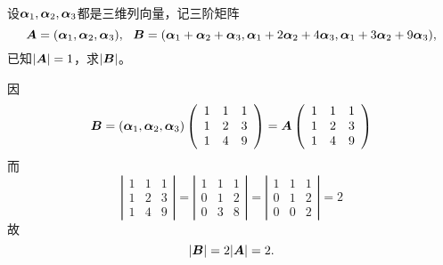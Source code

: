 \begin{frame}
  
    \begin{li}[2007－2008第二学期]
      设$\boldsymbol{\alpha}_1,\boldsymbol{\alpha}_2,\boldsymbol{\alpha}_3$都是三维列向量，记三阶矩阵
      $$
      \boldsymbol{A}=(\boldsymbol{\alpha}_1,\boldsymbol{\alpha}_2,\boldsymbol{\alpha}_3),~~
      \boldsymbol{B}=(\boldsymbol{\alpha}_1+\boldsymbol{\alpha}_2+\boldsymbol{\alpha}_3,\boldsymbol{\alpha}_1+2\boldsymbol{\alpha}_2+4\boldsymbol{\alpha}_3,\boldsymbol{\alpha}_1+3\boldsymbol{\alpha}_2+9\boldsymbol{\alpha}_3),
      $$已知$|\boldsymbol{A}|=1$，求$|\boldsymbol{B}|$。
    \end{li}
    \pause

    \begin{jie}
    因
    $$
    \boldsymbol{B}=(\boldsymbol{\alpha}_1,\boldsymbol{\alpha}_2,\boldsymbol{\alpha}_3)\left(
    \begin{array}{ccc}
      1&1&1\\
      1&2&3\\
      1&4&9
    \end{array}
    \right)=\boldsymbol{A}\left(
    \begin{array}{ccc}
      1&1&1\\
      1&2&3\\
      1&4&9
    \end{array}
    \right)
    $$
    而
    $$
    \left|
    \begin{array}{ccc}
      1&1&1\\
      1&2&3\\
      1&4&9
    \end{array}
    \right|=\left|
    \begin{array}{ccc}
      1&1&1\\
      0&1&2\\
      0&3&8
    \end{array}
    \right|=\left|
    \begin{array}{ccc}
      1&1&1\\
      0&1&2\\
      0&0&2
    \end{array}
    \right|=2    
    $$
    故$$|\boldsymbol{B}|=2|\boldsymbol{A}|=2.$$
  \end{jie}
\end{frame}


